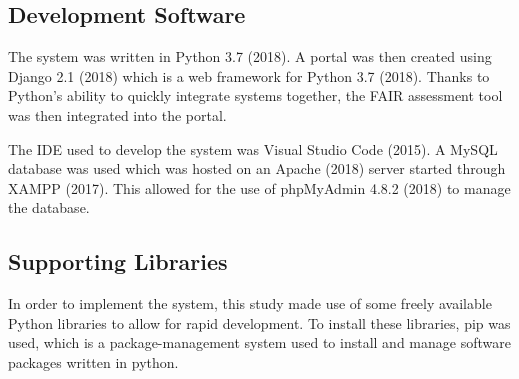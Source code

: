 \documentclass{cisfyp}
\begin{document}
\subsection{Development Software}
The system was written in Python 3.7 (2018). A portal was then created using Django 2.1 (2018) which is a web framework for Python 3.7 (2018). Thanks to Python's ability to quickly integrate systems together, the FAIR assessment tool was then integrated into the portal.

The IDE used to develop the system was Visual Studio Code (2015). A MySQL database was used which was hosted on an Apache (2018) server started through XAMPP (2017). This allowed for the use of phpMyAdmin 4.8.2 (2018) to manage the database.
\subsection{Supporting Libraries}
In order to implement the system, this study made use of some freely available Python libraries to allow for rapid development. To install these libraries, pip was used, which is a package-management system used to install and manage software packages written in python. \pagebreak
\end{document}
